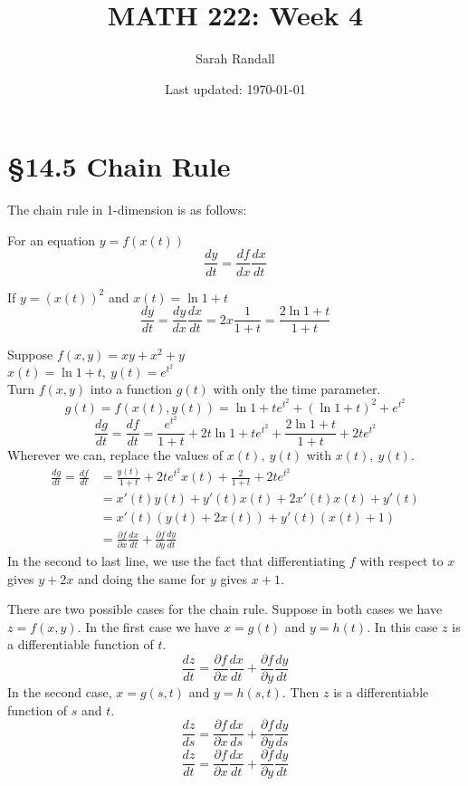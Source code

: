 \documentclass[12 pt]{article}
\author{Sarah Randall}
\date{Last updated: \today}
\title{MATH 222: Week 4}
\begin{document}
    \onehalfspacing
    \maketitle
    \tableofcontents
    \section{\S 14.5 Chain Rule}
        The chain rule in 1-dimension is as follows:

        For an equation $y=f(x(t))$
        $$\frac{dy}{dt}=\frac{df}{dx}\frac{dx}{dt}$$
        \begin{exmp*}
            If $y=(x(t))^2$ and $x(t)=\ln{1+t}$\\
            $$\frac{dy}{dt}=\frac{dy}{dx}\frac{dx}{dt}=2x\frac{1}{1+t}=\frac{2\ln{1+t}}{1+t}$$
        \end{exmp*}

        \begin{exmp*}
            Suppose $f(x,y)=xy+x^2+y$\\
            $x(t)=\ln{1+t},\ y(t)=e^{t^2}$\\
            Turn $f(x,y)$ into a function $g(t)$ with only the time parameter.
            $$g(t)=f(x(t),y(t))=\ln{1+t}e^{t^2}+(\ln{1+t})^2+e^{t^2}$$
            $$\frac{dg}{dt}=\frac{df}{dt}=\frac{e^{t^2}}{1+t}+2t\ln{1+t}e^{t^2}+\frac{2\ln{1+t}}{1+t}+2te^{t^2}$$
            Wherever we can, replace the values of $x(t),\ y(t)$ with $x(t),\ y(t)$.
            \begin{align*}
                \frac{dg}{dt}=\frac{df}{dt}&=\frac{y(t)}{1+t}+2te^{t^2}x(t)+\frac{2}{1+t}+2te^{t^2}\\
                &=x'(t)y(t)+y'(t)x(t)+2x'(t)x(t)+y'(t)\\
                &=x'(t)(y(t)+2x(t))+y'(t)(x(t)+1)\\
                &=\frac{\partial f}{\partial x}\frac{dx}{dt}+\frac{\partial f}{\partial y}\frac{dy}{dt}
            \end{align*}
            In the second to last line, we use the fact that differentiating $f$ with respect to $x$ gives $y+2x$ and doing the same for $y$ gives $x+1$.
        \end{exmp*}

        There are two possible cases for the chain rule. Suppose in both cases we have $z=f(x,y)$. In the first case we have $x=g(t)$ and $y=h(t)$. In this case $z$ is a differentiable function of $t$.
        $$\frac{dz}{dt}=\frac{\partial f}{\partial x}\frac{dx}{dt}+\frac{\partial f}{\partial y}\frac{dy}{dt}$$
        In the second case, $x=g(s,t)$ and $y=h(s,t)$. Then $z$ is a differentiable function of $s$ and $t$.
        $$\frac{dz}{ds}=\frac{\partial f}{\partial x}\frac{dx}{ds}+\frac{\partial f}{\partial y}\frac{dy}{ds}$$
        $$\frac{dz}{dt}=\frac{\partial f}{\partial x}\frac{dx}{dt}+\frac{\partial f}{\partial y}\frac{dy}{dt}$$
\end{document}
